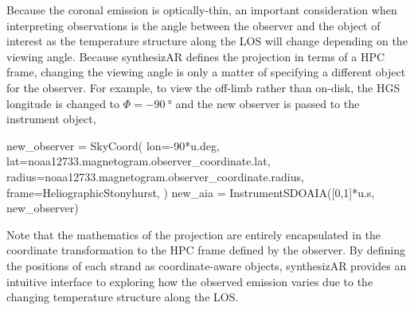 Because the coronal emission is optically-thin, an important consideration when interpreting observations is the angle between the observer and the object of interest as the temperature structure along the LOS will change depending on the viewing angle. Because synthesizAR defines the projection in terms of a HPC frame, changing the viewing angle is only a matter of specifying a different  object for the observer. For example, to view the \AR{} off-limb rather than on-disk, the HGS longitude is changed to $\Phi=\SI{-90}{\degree}$ and the new observer is passed to the instrument object,
\begin{pyblock}[chapter4][baselinestretch=1,xleftmargin=3em]
new_observer = SkyCoord(
    lon=-90*u.deg,
    lat=noaa12733.magnetogram.observer_coordinate.lat,
    radius=noaa12733.magnetogram.observer_coordinate.radius,
    frame=HeliographicStonyhurst,
)
new_aia = InstrumentSDOAIA([0,1]*u.s, new_observer)
\end{pyblock}
Note that the mathematics of the projection are entirely encapsulated in the coordinate transformation to the HPC frame defined by the observer. By defining the positions of each strand as coordinate-aware  objects, synthesizAR provides an intuitive interface to exploring how the observed emission varies due to the changing temperature structure along the LOS. 